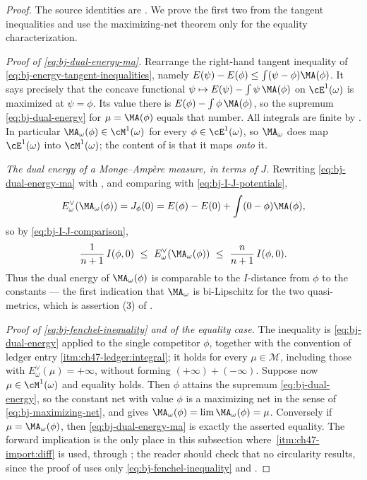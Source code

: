 \begin{proof}
The source identities are \cite[Proposition~9.6 and
Corollary~9.12]{BJ22}. We prove the first two from the tangent
inequalities and use the maximizing-net theorem only for the equality
characterization.

\emph{Proof of \eqref{eq:bj-dual-energy-ma}.} Rearrange the
right-hand tangent inequality of \eqref{eq:bj-energy-tangent-inequalities},
namely $E(\psi)-E(\phi)\le\int(\psi-\phi)\MA(\phi)$.
It says
precisely that the concave functional
$\psi\mapsto E(\psi)-\int\psi\,\MA(\phi)$ on $\cE^1(\omega)$ is
maximized at $\psi=\phi$.  Its value there is
$E(\phi)-\int\phi\,\MA(\phi)$, so the supremum
\eqref{eq:bj-dual-energy} for $\mu=\MA(\phi)$ equals that number.  All
integrals are finite by .  In particular
$\MA_\omega(\phi)\in\cM^1(\omega)$ for every $\phi\in\cE^1(\omega)$, so
$\MA_\omega$ does map $\cE^1(\omega)$ into $\cM^1(\omega)$; the
content of  is that it maps
\emph{onto} it.

\emph{The dual energy of a Monge--Amp\`ere measure, in terms of $J$.}
Rewriting \eqref{eq:bj-dual-energy-ma} with
, and comparing with
\eqref{eq:bj-I-J-potentials},
\[
 E^\vee_\omega(\MA_\omega(\phi))=J_\phi(0)
 =E(\phi)-E(0)+\int(0-\phi)\MA(\phi),
\]
so by \eqref{eq:bj-I-J-comparison},
\[
 \frac{1}{n+1}\,I(\phi,0)\ \le\ E^\vee_\omega(\MA_\omega(\phi))
 \ \le\ \frac{n}{n+1}\,I(\phi,0).
\]
Thus the dual energy of $\MA_\omega(\phi)$ is comparable to the
$I$-distance from $\phi$ to the constants --- the first indication that
$\MA_\omega$ is bi-Lipschitz for the two quasi-metrics, which is
assertion (3) of .

\emph{Proof of \eqref{eq:bj-fenchel-inequality} and of the equality case.}
The inequality is \eqref{eq:bj-dual-energy} applied to the single
competitor $\phi$, together with the convention of ledger entry
\cref{itm:ch47-ledger:integral}; it holds for every
$\mu\in\mathcal M$, including those with $E^\vee_\omega(\mu)=+\infty$, without forming
$(+\infty)+(-\infty)$.
Suppose now $\mu\in\cM^1(\omega)$ and equality holds.  Then $\phi$
attains the supremum \eqref{eq:bj-dual-energy}, so the constant net with
value $\phi$ is a maximizing net in the sense of
\eqref{eq:bj-maximizing-net}, and  gives
$\MA_\omega(\phi)=\lim\MA_\omega(\phi)=\mu$.  Conversely if
$\mu=\MA_\omega(\phi)$, then \eqref{eq:bj-dual-energy-ma} is exactly the
asserted equality.  The forward implication is the only place in this
subsection where \,\cref{itm:ch47-import:diff} is
used, through ; the reader should check
that no circularity results, since the proof of
 uses only
\eqref{eq:bj-fenchel-inequality} and
.
\end{proof}

